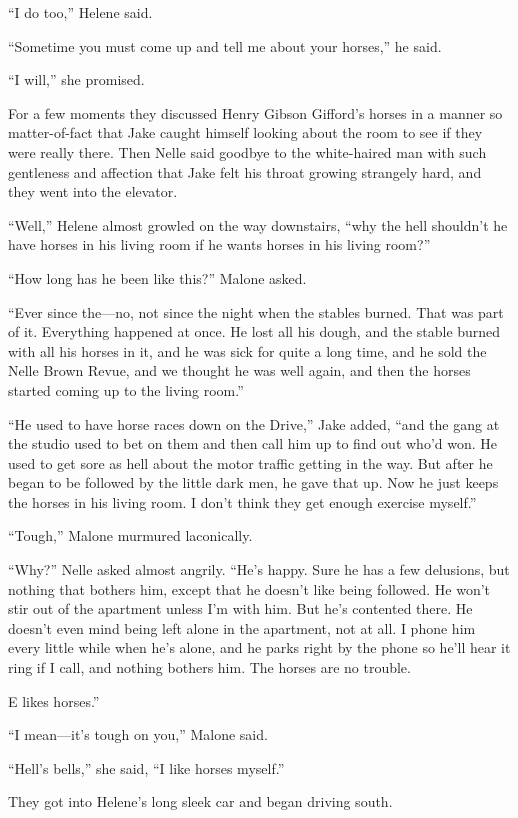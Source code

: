 \documentclass{novel}
\begin{document}
“I do too,” Helene said.

“Sometime you must come up and tell me about your horses,” he said.

“I will,” she promised.

For a few moments they discussed Henry Gibson Gifford’s horses in a manner so matter-of-fact that Jake caught himself looking about the room to see if they were really there. Then Nelle said goodbye to the white-haired man with such gentleness and affection that Jake felt his throat growing strangely hard, and they went into the elevator.

“Well,” Helene almost growled on the way downstairs, “why the hell shouldn’t he have horses in his living room if he wants horses in his living room?”

“How long has he been like this?” Malone asked.

“Ever since the—no, not since the night when the stables burned. That was part of it. Everything happened at once. He lost all his dough, and the stable burned with all his horses in it, and he was sick for quite a long time, and he sold the Nelle Brown Revue, and we thought he was well again, and then the horses started coming up to the living room.”

“He used to have horse races down on the Drive,” Jake added, “and the gang at the studio used to bet on them and then call him up to find out who’d won. He used to get sore as hell about the motor traffic getting in the way. But after he began to be followed by the little dark men, he gave that up. Now he just keeps the horses in his living room. I don’t think they get enough exercise myself.”

“Tough,” Malone murmured laconically.

“Why?” Nelle asked almost angrily. “He’s happy. Sure he has a few delusions, but nothing that bothers him, except that he doesn’t like being followed. He won’t stir out of the apartment unless I’m with him. But he’s contented there. He doesn’t even mind being left alone in the apartment, not at all. I phone him every little while when he’s alone, and he parks right by the phone so he’ll hear it ring if I call, and nothing bothers him. The horses are no trouble.

E likes horses.”

“I mean—it’s tough on you,” Malone said.

“Hell’s bells,” she said, “I like horses myself.”

They got into Helene’s long sleek car and began driving south.
\end{document}
